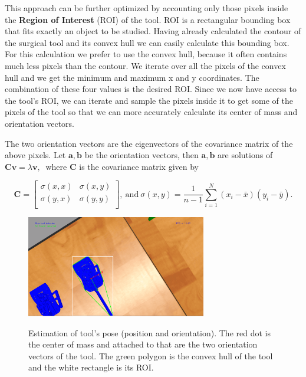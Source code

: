 This approach can be further optimized by accounting only those pixels inside the \textbf{Region of Interest} (ROI)  of the tool. ROI is a rectangular bounding box that fits exactly an object to be studied. Having already calculated the contour of the surgical tool and its convex hull we can easily calculate this bounding box. For this calculation we prefer to use the convex hull, because it often contains much less pixels than the contour. We iterate over all the pixels of the convex hull and we get the minimum and maximum x and y coordinates. The combination of these four values is the desired ROI. Since we now have access to the tool's ROI, we can iterate and sample the pixels inside it to get some of the pixels of the tool so that we can more accurately calculate its center of mass and orientation vectors. 

The two orientation vectors are the eigenvectors of the covariance matrix of the above pixels. Let $\mathbf{a},\mathbf{b}$ be the orientation vectors, 
then $\mathbf{a},\mathbf{b}$ are solutions of $
\mathbf{C} \mathbf{v} = λ \mathbf{v},~
$
where $\mathbf{C}$ is the covariance matrix given by

\begin{equation}
\label{eq:cov-matrix}
\mathbf{C} = \begin{bmatrix}
σ(x,x) & σ(x,y) \\
σ(y,x) & σ(y,y) \\
\end{bmatrix}
,~\mbox{and}~
\label{eq:cov-matrix-coeff}
σ(x,y) = \frac{1}{n-1} \sum_{i=1}^{N} ( x_i - \bar{x} )( y_i - \bar{y} ).
\end{equation}
\begin{center}
\begin{figure}[htbp]
\centering
\includegraphics[width=0.7\textwidth]{images/tool-pose.png}\\
\caption{Estimation of tool's pose (position and orientation). The red dot is the center of mass and attached to that are the two orientation vectors of the tool. The green polygon is the convex hull of the tool 
and the white rectangle is its ROI.}
\end{figure}
\end{center}

